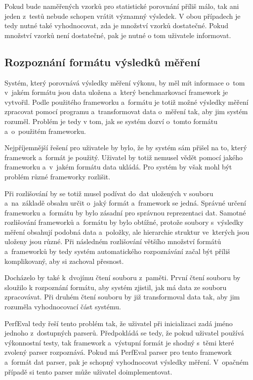 Pokud bude naměřených vzorků pro statistické porovnání příliš málo, tak ani jeden z~testů nebude schopen
vrátit významný výsledek. V obou případech je tedy nutné také vyhodnocovat, zda je množství vzorků dostatečné.
Pokud množství vzorků není dostatečné, pak je nutné o tom uživatele informovat.

\subsection{Rozpoznání formátu výsledků měření}

Systém, který porovnává výsledky měření výkonu, by měl mít informace o~tom v~jakém formátu jsou data uložena
a~který benchmarkovací framework je vytvořil. Podle použitého frameworku a~formátu je totiž možné výsledky
měření zpracovat pomocí programu a~transformovat data o~měření tak, aby jim systém rozuměl.
Problém je tedy v tom, jak se systém dozví o~tomto formátu a~o~použitém frameworku.

Nejpříjemnější řešení pro uživatele by bylo, že by systém sám přišel na to, který framework a~formát je použitý.
Uživatel by totiž nemusel vědět pomocí jakého frameworku a~v~jakém formátu data ukládá. Pro systém by však mohl
být problém různé frameworky rozlišit.

Při rozlišování by se totiž musel podívat do~dat uložených v souboru
a~na~základě obsahu určit o~jaký formát a~framework se jedná. Správné určení frameworku a~formátu by bylo zásadní pro
správnou reprezentaci dat. Samotné rozlišování frameworků a~formátu by bylo obtížné, protože soubory s~výsledky
měření obsahují podobná data a~položky, ale hierarchie struktur ve~kterých jsou uloženy jsou různé.
Při následném rozlišování většího množství formátů a~frameworků by tedy systém automatického rozpoznávání
začal být příliš komplikovaný, aby si zachoval přesnost.

Docházelo by také k~dvojímu čtení souboru z~paměti. První čtení souboru by sloužilo k rozpoznání formátu,
aby systém zjistil, jak má data ze souboru zpracovávat. Při druhém čtení souboru by již transformoval data
tak, aby jim rozuměla vyhodnocovací část systému.

PerfEval tedy řeší tento problém tak, že uživatel při inicializaci zadá jméno jednoho z~dostupných parserů.
Předpokládá se tedy, že pokud uživatel používá výkonnostní testy, tak framework a~výstupní formát je shodný s~těmi které zvolený parser rozpoznává.
Pokud má PerfEval parser pro tento framework a~formát dat parser, pak je schopný vyhodnocovat výsledky měření.
V~opačném případě si tento parser může uživatel doimplementovat.

